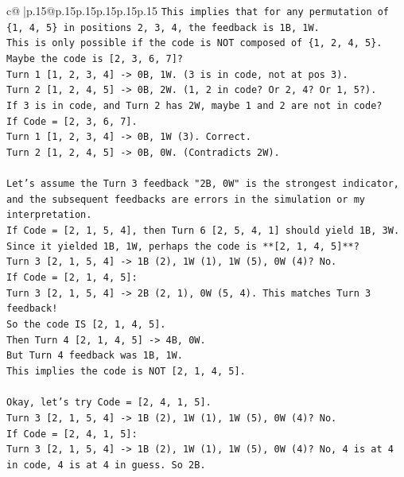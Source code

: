 \documentclass{article}
\begin{document}
{\begin{supertabular}{c@{$\;$}|p{.15\linewidth}@{}p{.15\linewidth}p{.15\linewidth}p{.15\linewidth}p{.15\linewidth}p{.15\linewidth}}
{{{\texttt{This implies that for any permutation of \{1, 4, 5\} in positions 2, 3, 4, the feedback is 1B, 1W.} \\
\texttt{This is only possible if the code is NOT composed of \{1, 2, 4, 5\}.} \\
\texttt{Maybe the code is {[}2, 3, 6, 7{]}?} \\
\texttt{Turn 1 {[}1, 2, 3, 4{]} {-}> 0B, 1W. (3 is in code, not at pos 3).} \\
\texttt{Turn 2 {[}1, 2, 4, 5{]} {-}> 0B, 2W. (1, 2 in code? Or 2, 4? Or 1, 5?).} \\
\texttt{If 3 is in code, and Turn 2 has 2W, maybe 1 and 2 are not in code?} \\
\texttt{If Code = {[}2, 3, 6, 7{]}.} \\
\texttt{Turn 1 {[}1, 2, 3, 4{]} {-}> 0B, 1W (3). Correct.} \\
\texttt{Turn 2 {[}1, 2, 4, 5{]} {-}> 0B, 0W. (Contradicts 2W).} \\
\\ 
\texttt{Let's assume the Turn 3 feedback "2B, 0W" is the strongest indicator, and the subsequent feedbacks are errors in the simulation or my interpretation.} \\
\texttt{If Code = {[}2, 1, 5, 4{]}, then Turn 6 {[}2, 5, 4, 1{]} should yield 1B, 3W.} \\
\texttt{Since it yielded 1B, 1W, perhaps the code is **{[}2, 1, 4, 5{]}**?} \\
\texttt{Turn 3 {[}2, 1, 5, 4{]} {-}> 1B (2), 1W (1), 1W (5), 0W (4)? No.} \\
\texttt{If Code = {[}2, 1, 4, 5{]}:} \\
\texttt{Turn 3 {[}2, 1, 5, 4{]} {-}> 2B (2, 1), 0W (5, 4). This matches Turn 3 feedback!} \\
\texttt{So the code IS {[}2, 1, 4, 5{]}.} \\
\texttt{Then Turn 4 {[}2, 1, 4, 5{]} {-}> 4B, 0W.} \\
\texttt{But Turn 4 feedback was 1B, 1W.} \\
\texttt{This implies the code is NOT {[}2, 1, 4, 5{]}.} \\
\\ 
\texttt{Okay, let's try Code = {[}2, 4, 1, 5{]}.} \\
\texttt{Turn 3 {[}2, 1, 5, 4{]} {-}> 1B (2), 1W (1), 1W (5), 0W (4)? No.} \\
\texttt{If Code = {[}2, 4, 1, 5{]}:} \\
\texttt{Turn 3 {[}2, 1, 5, 4{]} {-}> 1B (2), 1W (1), 1W (5), 0W (4)? No, 4 is at 4 in code, 4 is at 4 in guess. So 2B.} \\
}}}
\end{supertabular}}
\end{document}

